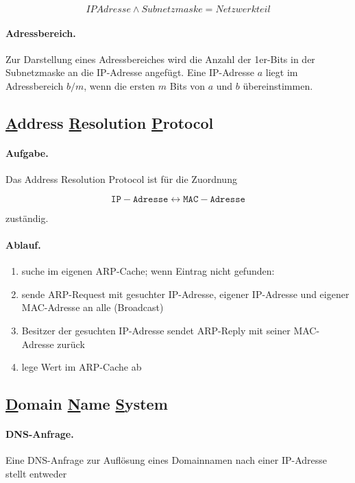 \documentclass[]{scrartcl}
\begin{document}
$$IPAdresse \wedge Subnetzmaske = Netzwerkteil$$

\paragraph{Adressbereich.}Zur Darstellung eines Adressbereiches wird die Anzahl der 1er-Bits in der Subnetzmaske an die IP-Adresse angef\"ugt. Eine IP-Adresse $a$ liegt im Adressbereich $b/m$, wenn die ersten $m$ Bits von $a$ und $b$ \"ubereinstimmen.


\subsection{\underline{A}ddress \underline{R}esolution \underline{P}rotocol} 

\paragraph{Aufgabe.}Das Address Resolution Protocol ist f\"ur die Zuordnung

$$\mathtt{IP-Adresse} \leftrightarrow \mathtt{MAC-Adresse}$$

zust\"andig.

\paragraph{Ablauf.}
\begin{enumerate}
\item suche im eigenen ARP-Cache; wenn Eintrag nicht gefunden:
\item sende ARP-Request mit gesuchter IP-Adresse, eigener IP-Adresse und eigener MAC-Adresse an alle (Broadcast)
\item Besitzer der gesuchten IP-Adresse sendet ARP-Reply mit seiner MAC-Adresse zur\"uck
\item lege Wert im ARP-Cache ab
\end{enumerate}


\subsection{\underline{D}omain \underline{N}ame \underline{S}ystem}

\paragraph{DNS-Anfrage.} Eine DNS-Anfrage zur Aufl\"osung eines Domainnamen nach einer IP-Adresse stellt entweder
\end{document}
